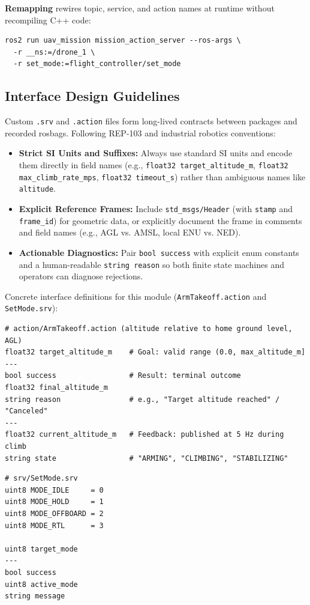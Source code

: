 \documentclass{article}
\begin{document}
\textbf{Remapping} rewires topic, service, and action names at runtime without recompiling C++ code:
\begin{verbatim}
ros2 run uav_mission mission_action_server --ros-args \
  -r __ns:=/drone_1 \
  -r set_mode:=flight_controller/set_mode
\end{verbatim}

\subsection{Interface Design Guidelines}
Custom \texttt{.srv} and \texttt{.action} files form long-lived contracts between packages and recorded rosbags. Following REP-103 and industrial robotics conventions:
\begin{itemize}
    \item \textbf{Strict SI Units and Suffixes:} Always use standard SI units and encode them directly in field names (e.g., \texttt{float32 target\_altitude\_m}, \texttt{float32 max\_climb\_rate\_mps}, \texttt{float32 timeout\_s}) rather than ambiguous names like \texttt{altitude}.
    \item \textbf{Explicit Reference Frames:} Include \texttt{std\_msgs/Header} (with \texttt{stamp} and \texttt{frame\_id}) for geometric data, or explicitly document the frame in comments and field names (e.g., AGL vs. AMSL, local ENU vs. NED).
    \item \textbf{Actionable Diagnostics:} Pair \texttt{bool success} with explicit enum constants and a human-readable \texttt{string reason} so both finite state machines and operators can diagnose rejections.
\end{itemize}

Concrete interface definitions for this module (\texttt{ArmTakeoff.action} and \texttt{SetMode.srv}):

\begin{verbatim}
# action/ArmTakeoff.action (altitude relative to home ground level, AGL)
float32 target_altitude_m    # Goal: valid range (0.0, max_altitude_m]
---
bool success                 # Result: terminal outcome
float32 final_altitude_m
string reason                # e.g., "Target altitude reached" / "Canceled"
---
float32 current_altitude_m   # Feedback: published at 5 Hz during climb
string state                 # "ARMING", "CLIMBING", "STABILIZING"
\end{verbatim}

\begin{verbatim}
# srv/SetMode.srv
uint8 MODE_IDLE     = 0
uint8 MODE_HOLD     = 1
uint8 MODE_OFFBOARD = 2
uint8 MODE_RTL      = 3

uint8 target_mode
---
bool success
uint8 active_mode
string message
\end{verbatim}
\end{document}
